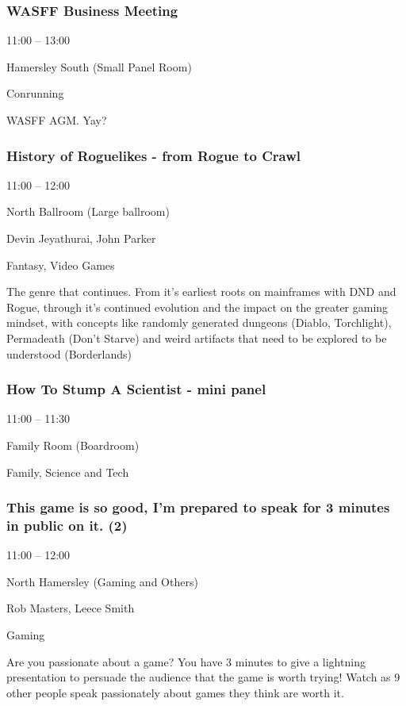 \documentclass{scrreprt}
\begin{document}
\begin{multicols}{2}
\subsubsection*{WASFF Business Meeting}\begin{description}
\setlength{\itemsep}{0pt}
\setlength{\parsep}{0pt}
\setlength{\parskip}{0pt}
\item[Time:]{11:00 -- 13:00}
\item[Venue:]{Hamersley South (Small Panel Room)}
\item[Tags:]{Conrunning}\end{description}
WASFF AGM. Yay?
\subsubsection*{History of Roguelikes - from Rogue to Crawl}\begin{description}
\setlength{\itemsep}{0pt}
\setlength{\parsep}{0pt}
\setlength{\parskip}{0pt}
\item[Time:]{11:00 -- 12:00}
\item[Venue:]{North Ballroom (Large ballroom)}
\item[People:]{Devin Jeyathurai, John Parker}
\item[Tags:]{Fantasy, Video Games}\end{description}
The genre that continues. From it's earliest roots on mainframes with DND and Rogue, through it's continued evolution and the impact on the greater gaming mindset, with concepts like randomly generated dungeons (Diablo, Torchlight), Permadeath (Don't Starve) and weird artifacts that need to be explored to be understood (Borderlands)
\subsubsection*{How To Stump A Scientist - mini panel}\begin{description}
\setlength{\itemsep}{0pt}
\setlength{\parsep}{0pt}
\setlength{\parskip}{0pt}
\item[Time:]{11:00 -- 11:30}
\item[Venue:]{Family Room (Boardroom)}
\item[Tags:]{Family, Science and Tech}\end{description}

\subsubsection*{This game is so good, I'm prepared to speak for 3 minutes in public on it. (2)}\begin{description}
\setlength{\itemsep}{0pt}
\setlength{\parsep}{0pt}
\setlength{\parskip}{0pt}
\item[Time:]{11:00 -- 12:00}
\item[Venue:]{North Hamersley (Gaming and Others)}
\item[People:]{Rob Masters, Leece Smith}
\item[Tags:]{Gaming}\end{description}
Are you passionate about a game? You have 3 minutes to give a lightning presentation to persuade the audience that the game is worth trying! Watch as 9 other people speak passionately about games they think are worth it.

\end{multicols}
\end{document}

